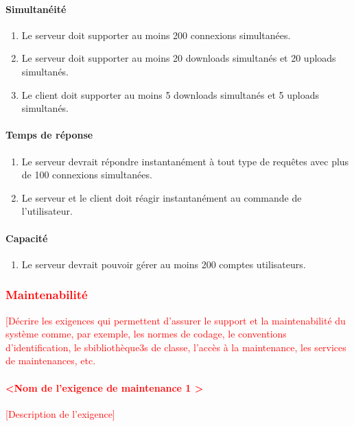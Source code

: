 \documentclass[10pt,a4paper]{report}
\begin{document}
\paragraph{Simultanéité}

	\begin{enumerate}
		\item Le serveur doit supporter au moins 200 connexions simultanées.
		\item Le serveur doit supporter au moins 20 downloads simultanés et 20 uploads simultanés.
		\item Le client doit supporter au moins 5 downloads simultanés et 5 uploads simultanés.
	\end{enumerate}
	
\paragraph{Temps de réponse}
	
	\begin{enumerate}
		\item Le serveur devrait répondre instantanément à tout type de requêtes avec plus de 100 connexions simultanées.
		\item Le serveur et le client doit réagir instantanément au commande de l'utilisateur. 
	\end{enumerate}

\paragraph{Capacité}

 	\begin{enumerate}
 		\item Le serveur devrait pouvoir gérer au moins 200 comptes utilisateurs.
 	\end{enumerate}
\textcolor{red}{\subsubsection{Maintenabilité}
[Décrire les exigences qui permettent d’assurer le support et la maintenabilité du système comme, par exemple, les normes de codage, le conventions d’identification, le sbibliothèque3s de classe, l’accès à la maintenance, les services de maintenances, etc. 
\paragraph{\textless Nom de l’exigence de maintenance 1 \textgreater}
[Description de l’exigence]}
\end{document}
